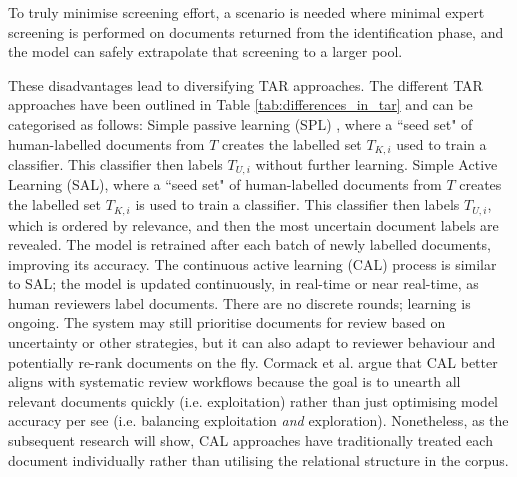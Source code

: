 \documentclass[10pt,oneside]{book}
\begin{document}
To truly minimise screening effort, a scenario is needed where minimal expert screening is performed on documents returned from the identification phase, and the model can safely extrapolate that screening to a larger pool.

These disadvantages lead to diversifying TAR approaches. The different TAR approaches have been outlined in Table \ref{tab:differences_in_tar} and can be categorised as follows: Simple passive learning (SPL) \cite{cohen_reducing_2006}, where a ``seed set" of human-labelled documents from $T$ creates the labelled set $T_{K,i}$ used to train a classifier. This classifier then labels $T_{U, i}$ without further learning. Simple Active Learning (SAL), where a ``seed set" of human-labelled documents from $T$ creates the labelled set $T_{K,i}$ is used to train a classifier. This classifier then labels $T_{U, i}$, which is ordered by relevance, and then the most uncertain document labels are revealed. The model is retrained after each batch of newly labelled documents, improving its accuracy. The continuous active learning (CAL) process is similar to SAL; the model is updated continuously, in real-time or near real-time, as human reviewers label documents. There are no discrete rounds; learning is ongoing. The system may still prioritise documents for review based on uncertainty or other strategies, but it can also adapt to reviewer behaviour and potentially re-rank documents on the fly. Cormack et al. \cite{cormack_autonomy_2015} argue that CAL better aligns with systematic review workflows because the goal is to unearth all relevant documents quickly (i.e. exploitation) rather than just optimising model accuracy per see (i.e. balancing exploitation \emph{and} exploration). Nonetheless, as the subsequent research will show, CAL approaches have traditionally treated each document individually rather than utilising the relational structure in the corpus.
\end{document}
